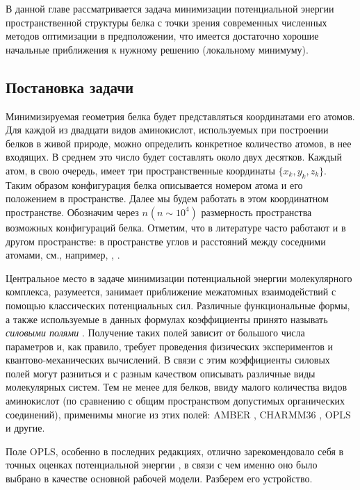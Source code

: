   В данной главе рассматривается задача минимизации потенциальной энергии пространственной структуры белка с точки зрения современных численных методов оптимизации в предположении, что имеется достаточно хорошие начальные приближения к нужному решению (локальному минимуму).

  \subsection{Постановка задачи} \label{subsec:sec1/su2}

  Минимизируемая геометрия белка будет представляться координатами его атомов.
  Для каждой из двадцати видов аминокислот, используемых при построении белков в живой природе, можно определить конкретное количество атомов, в нее входящих.
  В среднем это число будет составлять около двух десятков.
  Каждый атом, в свою очередь, имеет три пространственные координаты $\{x_k ,y_k ,z_k\}$. Таким образом конфигурация белка описывается номером атома и его положением в пространстве.
  Далее мы будем работать в этом координатном пространстве.
  Обозначим через $n_{ }\left(n\sim 10^4\right)$ размерность пространства возможных конфигураций белка.
  Отметим, что в литературе часто работают и в другом пространстве: в пространстве углов и расстояний между соседними атомами, см., например, \cite{canutescu2003cyclic}, \cite{coutsias2004kinematic}. 

  Центральное место в задаче минимизации потенциальной энергии молекулярного комплекса, разумеется, занимает приближение межатомных взаимодействий с помощью классических потенциальных сил.
  Различные функциональные формы, а также используемые в данных формулах коэффициенты принято называть \textit{силовыми полями} \cite{Ponder2003}.
  Получение таких полей зависит от большого числа параметров и, как правило, требует проведения физических экспериментов и квантово-механических вычислений.
  В связи с этим коэффициенты силовых полей могут разниться и с разным качеством описывать различные виды молекулярных систем.
  Тем не менее для белков, ввиду малого количества видов аминокислот (по сравнению с общим пространством допустимых органических соединений), применимы многие из этих полей: AMBER \cite{Cornell1995}, CHARMM36 \cite{Huang2017}, OPLS \cite{Jorgensen1996} и другие.

  Поле OPLS, особенно в последних редакциях, отлично зарекомендовало себя в точных оценках потенциальной энергии \cite{Sweere2017}, в связи с чем именно оно было
  выбрано в качестве основной рабочей модели.
  Разберем его устройство.

